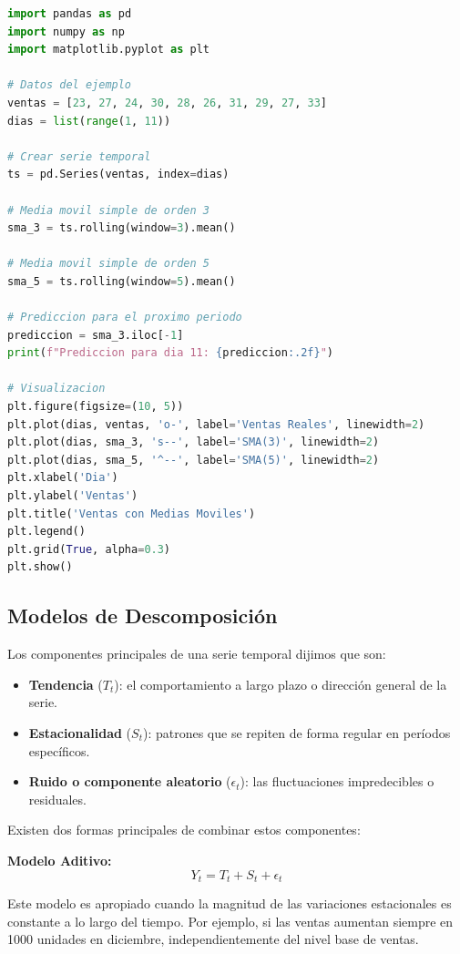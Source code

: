 \documentclass[12pt]{article}
\begin{document}
\begin{lstlisting}[language=Python]
import pandas as pd
import numpy as np
import matplotlib.pyplot as plt

# Datos del ejemplo
ventas = [23, 27, 24, 30, 28, 26, 31, 29, 27, 33]
dias = list(range(1, 11))

# Crear serie temporal
ts = pd.Series(ventas, index=dias)

# Media movil simple de orden 3
sma_3 = ts.rolling(window=3).mean()

# Media movil simple de orden 5
sma_5 = ts.rolling(window=5).mean()

# Prediccion para el proximo periodo
prediccion = sma_3.iloc[-1]
print(f"Prediccion para dia 11: {prediccion:.2f}")

# Visualizacion
plt.figure(figsize=(10, 5))
plt.plot(dias, ventas, 'o-', label='Ventas Reales', linewidth=2)
plt.plot(dias, sma_3, 's--', label='SMA(3)', linewidth=2)
plt.plot(dias, sma_5, '^--', label='SMA(5)', linewidth=2)
plt.xlabel('Dia')
plt.ylabel('Ventas')
plt.title('Ventas con Medias Moviles')
plt.legend()
plt.grid(True, alpha=0.3)
plt.show()
\end{lstlisting}

\subsection{Modelos de Descomposición}

Los componentes principales de una serie temporal dijimos que son:

\begin{itemize}
    \item \textbf{Tendencia} ($T_t$): el comportamiento a largo plazo o dirección general de la serie.
    \item \textbf{Estacionalidad} ($S_t$): patrones que se repiten de forma regular en períodos específicos.
    \item \textbf{Ruido o componente aleatorio} ($\epsilon_t$): las fluctuaciones impredecibles o residuales.
\end{itemize}

Existen dos formas principales de combinar estos componentes:

\vspace{0.5em}

\textbf{Modelo Aditivo:}
\[
Y_t = T_t + S_t + \epsilon_t
\]

Este modelo es apropiado cuando la magnitud de las variaciones estacionales es constante a lo largo del tiempo. Por ejemplo, si las ventas aumentan siempre en 1000 unidades en diciembre, independientemente del nivel base de ventas.
\end{document}
